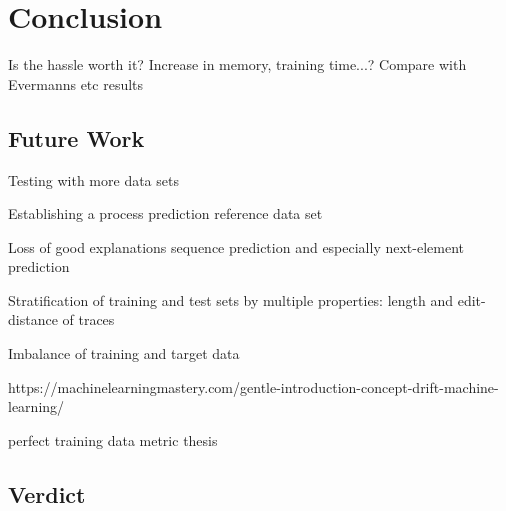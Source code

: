 \chapter{Conclusion} \label{chap:conclusion}
Is the hassle worth it?
Increase in memory, training time...?
Compare with Evermanns etc results

\section{Future Work} \label{sec:conclusion:future-work}
Testing with more data sets

Establishing a process prediction reference data set

Loss of good explanations sequence prediction and especially next-element prediction

Stratification of training and test sets by multiple properties: length and edit-distance of traces

Imbalance of training and target data

https://machinelearningmastery.com/gentle-introduction-concept-drift-machine-learning/

perfect training data metric thesis

\section{Verdict} \label{sec:conclusion:verdict}
